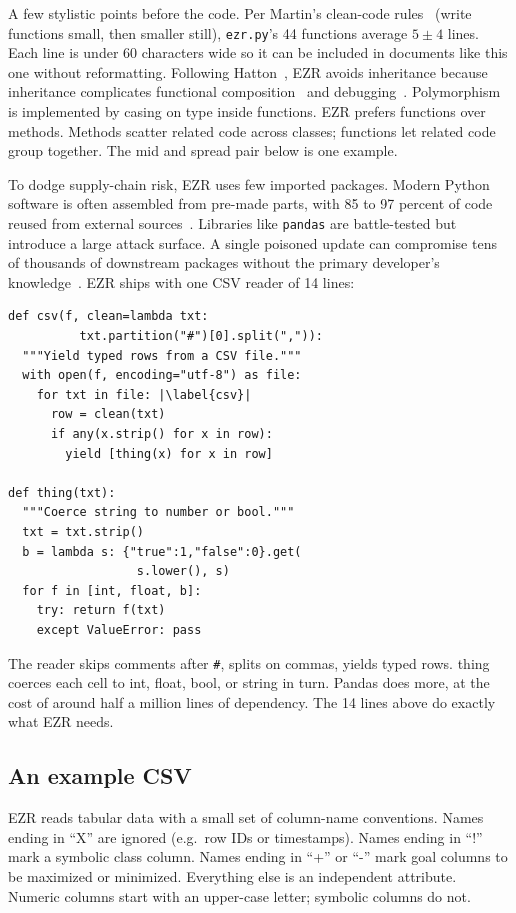 \documentclass[AMA,STIX2COL]{WileyNJDv5}
\newcommand{\IT}{{\sffamily EZR}}
\begin{document}
A few stylistic points before the code. Per Martin's clean-code
rules~\cite{martin2009clean} (write functions small, then
smaller still), \texttt{ezr.py}'s 44 functions average $5\pm4$
lines. Each line is under 60 characters wide so it can be
included in documents like this one without reformatting.
Following Hatton~\cite{Hatton:1998}, \IT{} avoids inheritance
because inheritance complicates functional
composition~\cite{GoF:1995} and debugging~\cite{hatton1998oo}.
Polymorphism is implemented by casing on type inside functions.
\IT{} prefers functions over methods. Methods scatter related
code across classes; functions let related code group together.
The \textsf{mid} and \textsf{spread} pair below is one example.

To dodge supply-chain risk, \IT{} uses few imported packages.
Modern Python software is often assembled from pre-made parts,
with 85 to 97 percent of code reused from external
sources~\cite{martinez2021}. Libraries like \texttt{pandas} are
battle-tested but introduce a large attack surface. A single
poisoned update can compromise tens of thousands of downstream
packages without the primary developer's
knowledge~\cite{martinez2021}. \IT{} ships with one CSV reader
of 14 lines:

\begin{verbatim}
def csv(f, clean=lambda txt:
          txt.partition("#")[0].split(",")):
  """Yield typed rows from a CSV file."""
  with open(f, encoding="utf-8") as file:
    for txt in file: |\label{csv}|
      row = clean(txt)
      if any(x.strip() for x in row):
        yield [thing(x) for x in row]

def thing(txt):
  """Coerce string to number or bool."""
  txt = txt.strip()
  b = lambda s: {"true":1,"false":0}.get(
                  s.lower(), s)
  for f in [int, float, b]:
    try: return f(txt)
    except ValueError: pass
\end{verbatim}

The reader skips comments after \texttt{\#}, splits on commas,
yields typed rows. \textsf{thing} coerces each cell to int,
float, bool, or string in turn. Pandas does more, at the cost
of around half a million lines of dependency. The 14 lines
above do exactly what \IT{} needs.

\subsection{An example CSV}

\IT{} reads tabular data with a small set of column-name
conventions. Names ending in ``X'' are ignored (e.g.\ row IDs
or timestamps). Names ending in ``!'' mark a symbolic class
column. Names ending in ``+'' or ``-'' mark goal columns to be
maximized or minimized. Everything else is an independent
attribute. Numeric columns start with an upper-case letter;
symbolic columns do not.
\end{document}
